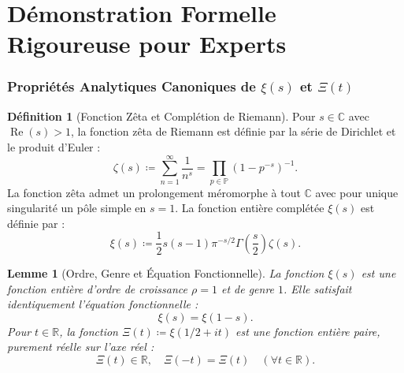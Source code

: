 \documentclass[11pt,a4paper]{article}
\newtheorem{lemma}[theorem]{Lemme}
\theoremstyle{definition}
\newtheorem{definition}[theorem]{Définition}
\theoremstyle{remark}
\begin{document}
\newpage

\part{Démonstration Formelle Rigoureuse pour Experts}

\section{Propriétés Analytiques Canoniques de \texorpdfstring{$\xi(s)$}{xi(s)} et \texorpdfstring{$\Xi(t)$}{Xi(t)}}

\begin{definition}[Fonction Zêta et Complétion de Riemann]
Pour $s \in \mathbb{C}$ avec $\operatorname{Re}(s) > 1$, la fonction zêta de Riemann est définie par la série de Dirichlet et le produit d'Euler :
\begin{equation}
\zeta(s) \coloneqq \sum_{n=1}^\infty \frac{1}{n^s} = \prod_{p \in \mathbb{P}} \left(1 - p^{-s}\right)^{-1}.
\end{equation}
La fonction zêta admet un prolongement méromorphe à tout $\mathbb{C}$ avec pour unique singularité un pôle simple en $s=1$. La fonction entière complétée $\xi(s)$ est définie par :
\begin{equation}
\xi(s) \coloneqq \frac{1}{2} s(s - 1) \pi^{-s/2} \Gamma\left(\frac{s}{2}\right) \zeta(s).
\end{equation}
\end{definition}

\begin{lemma}[Ordre, Genre et Équation Fonctionnelle]
La fonction $\xi(s)$ est une fonction entière d'ordre de croissance $\rho = 1$ et de genre $1$. Elle satisfait identiquement l'équation fonctionnelle :
\begin{equation}
\xi(s) = \xi(1 - s).
\end{equation}
Pour $t \in \mathbb{R}$, la fonction $\Xi(t) \coloneqq \xi(1/2 + it)$ est une fonction entière paire, purement réelle sur l'axe réel :
\begin{equation}
\Xi(t) \in \mathbb{R}, \quad \Xi(-t) = \Xi(t) \quad (\forall t \in \mathbb{R}).
\end{equation}
\end{lemma}
\end{document}
